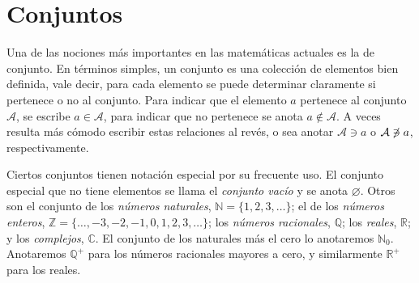 \section{Conjuntos}
\label{sec:conjuntos}

  Una de las nociones más importantes en las matemáticas actuales
  es la de conjunto.
  En términos simples,
  un conjunto es una colección de elementos
  bien definida,
  vale decir,
  para cada elemento se puede determinar claramente
  si pertenece o no al conjunto.
  Para indicar que el elemento \(a\)
  pertenece al conjunto \(\mathcal{A}\),
  se escribe \(a \in \mathcal{A}\),%
  para indicar que no pertenece se anota \(a \notin \mathcal{A}\).%
  A veces resulta más cómodo escribir estas relaciones al revés,
  o sea anotar \(\mathcal{A} \ni a\)%
  o \(\mathcal{A} \centernot\ni a\),
  respectivamente.

  Ciertos conjuntos tienen notación especial por su frecuente uso.
  El conjunto especial que no tiene elementos
  se llama el \emph{conjunto vacío} y se anota \(\varnothing\).%
  Otros son el conjunto de los \emph{números naturales},
  \(\mathbb{N} = \{1, 2, 3, \dotsc\}\);%
  el de los \emph{números enteros},
  \(\mathbb{Z} = \{\dotsc, - 3, -2, -1, 0, 1, 2, 3, \dotsc\}\);%
  los \emph{números racionales},
  \(\mathbb{Q}\);%
  los \emph{reales},
  \(\mathbb{R}\);%
  y los \emph{complejos},
  \(\mathbb{C}\).
  El conjunto de los naturales más el cero lo anotaremos
  \(\mathbb{N}_0\).%
  Anotaremos \(\mathbb{Q}^+\)
  para los números racionales mayores a cero,%
  y similarmente \(\mathbb{R}^+\) para los reales.%


